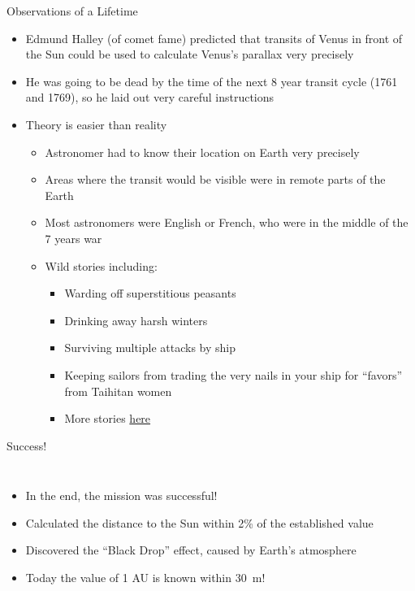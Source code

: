 \documentclass[pdf, aspectratio=169]{beamer}
\begin{document}
\begin{frame}{Observations of a Lifetime}
  \begin{itemize}
	\item Edmund Halley (of comet fame) predicted that transits of Venus in front of the Sun could be used to calculate Venus's parallax very precisely
	\item He was going to be dead by the time of the next 8 year transit cycle (1761 and 1769), so he laid out very careful instructions
	\item Theory is easier than reality
	  \begin{itemize}
		\item Astronomer had to know their location on Earth very precisely
		\item Areas where the transit would be visible were in remote parts of the Earth
		\item Most astronomers were English or French, who were in the middle of the 7 years war
		\item Wild stories including:
		  \begin{itemize}
			\item Warding off superstitious peasants
			\item Drinking away harsh winters
			\item Surviving multiple attacks by ship
			\item Keeping sailors from trading the very nails in your ship for ``favors'' from Taihitan women
			\item More stories \href{http://www.astronomy.ohio-state.edu/~pogge/Ast161/Unit4/venussun.html}{\textcolor{LOrange}{here}}
		  \end{itemize}
	  \end{itemize}
  \end{itemize}
\end{frame}

\begin{frame}{Success!}
  \begin{columns}
	\begin{itemize}
	  \item In the end, the mission was successful!
	  \item Calculated the distance to the Sun within 2\% of the established value
	  \item Discovered the ``Black Drop'' effect, caused by Earth's atmosphere
	  \item Today the value of 1 AU is known within \alert{\SI{30}{\meter}}!
	\end{itemize}
	\begin{center}
	\end{center}
  \end{columns}
\end{frame}
\end{document}
